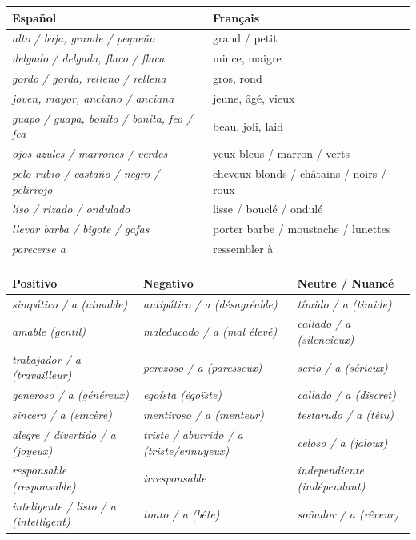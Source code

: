 \documentclass[11pt]{article}
\newcommand{\esp}[1]{\ifmmode\text{\textit{#1}}\else\begingroup\selectlanguage{spanish}\itshape #1\endgroup\fi}
\begin{document}
\begin{definition}
\begin{center}
\begin{tabularx}{\linewidth}{|X|X|}
\hline
\rowcolor{popgreenL} Español & Français \\
\hline
\esp{alto / baja}, \esp{grande / pequeño} & grand / petit \\
\esp{delgado / delgada}, \esp{flaco / flaca} & mince, maigre \\
\esp{gordo / gorda}, \esp{relleno / rellena} & gros, rond \\
\esp{joven}, \esp{mayor}, \esp{anciano / anciana} & jeune, âgé, vieux \\
\esp{guapo / guapa}, \esp{bonito / bonita}, \esp{feo / fea} & beau, joli, laid \\
\esp{ojos azules / marrones / verdes} & yeux bleus / marron / verts \\
\esp{pelo rubio / castaño / negro / pelirrojo} & cheveux blonds / châtains / noirs / roux \\
\esp{liso / rizado / ondulado} & lisse / bouclé / ondulé \\
\esp{llevar barba / bigote / gafas} & porter barbe / moustache / lunettes \\
\esp{parecerse a} & ressembler à \\
\hline
\end{tabularx}
\end{center}
\end{definition}

\begin{definition}
\begin{center}
\begin{tabularx}{\linewidth}{|X|X|X|}
\hline
\rowcolor{poppurpleL} Positivo & Negativo & Neutre / Nuancé \\
\hline
\esp{simpático / a} (aimable) & \esp{antipático / a} (désagréable) & \esp{tímido / a} (timide) \\
\esp{amable} (gentil) & \esp{maleducado / a} (mal élevé) & \esp{callado / a} (silencieux) \\
\esp{trabajador / a} (travailleur) & \esp{perezoso / a} (paresseux) & \esp{serio / a} (sérieux) \\
\esp{generoso / a} (généreux) & \esp{egoísta} (égoïste) & \esp{callado / a} (discret) \\
\esp{sincero / a} (sincère) & \esp{mentiroso / a} (menteur) & \esp{testarudo / a} (têtu) \\
\esp{alegre / divertido / a} (joyeux) & \esp{triste / aburrido / a} (triste/ennuyeux) & \esp{celoso / a} (jaloux) \\
\esp{responsable} (responsable) & \esp{irresponsable} & \esp{independiente} (indépendant) \\
\esp{inteligente / listo / a} (intelligent) & \esp{tonto / a} (bête) & \esp{soñador / a} (rêveur) \\
\hline
\end{tabularx}
\end{center}
\end{definition}
\end{document}
